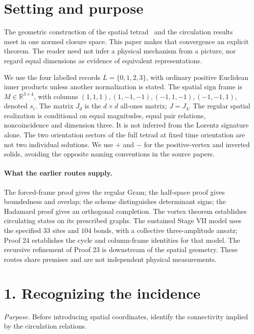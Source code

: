\section*{Setting and purpose}
The geometric construction of the spatial tetrad~\cite{frame,half,scheme,gram,hadamard} and the circulation results~\cite{vortex,flywheel,p24} meet in one normed closure space. This paper makes that convergence an explicit theorem. The reader need not infer a physical mechanism from a picture, nor regard equal dimensions as evidence of equivalent representations.

We use the four labelled records $L=\{0,1,2,3\}$, with ordinary positive Euclidean inner products unless another normalization is stated. The spatial sign frame is $M\in\mathbb R^{3\times4}$, with columns $(1,1,1),(1,-1,-1),(-1,1,-1),(-1,-1,1)$, denoted $s_i$. The matrix $J_d$ is the $d\times d$ all-ones matrix; $J=J_4$. The regular spatial realization is conditional on equal magnitudes, equal pair relations, noncoincidence and dimension three. It is not inferred from the Lorentz signature alone. The two orientation sectors of the full tetrad at fixed time orientation are not two individual solutions. We use $+$ and $-$ for the positive-vertex and inverted solids, avoiding the opposite naming conventions in the source papers.

\paragraph{What the earlier routes supply.} The forced-frame proof gives the regular Gram; the half-space proof gives boundedness and overlap; the scheme distinguishes determinant signs; the Hadamard proof gives an orthogonal completion. The vortex theorem establishes circulating states on its prescribed graphs. The sustained Stage VII model uses the specified $33$ sites and $104$ bonds, with a collective three-amplitude ansatz; Proof 24 establishes the cycle and column-frame identities for that model. The recursive refinement of Proof 23 is downstream of the spatial geometry. These routes share premises and are not independent physical measurements.

\section*{1. Recognizing the incidence}
\textit{Purpose.} Before introducing spatial coordinates, identify the connectivity implied by the circulation relations.

